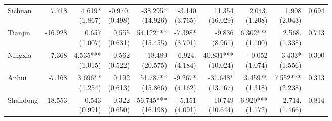\documentclass[12pt]{article}
\begin{document}
\begin{landscape}
\begin{small}
\begin{longtable}{lrrrrrrrrr}
    Sichuan & 7.718 & \makecell[r]{4.619*\\(1.867)} & \makecell[r]{-0.970.\\(0.498)} & \makecell[r]{-38.295*\\(14.926)} & \makecell[r]{-3.140\\(3.765)} & \makecell[r]{11.354\\(16.029)} & \makecell[r]{2.043.\\(1.208)} & \makecell[r]{1.908\\(2.043)} & 0.694 \\
    Tianjin & -16.928 & \makecell[r]{0.657\\(1.007)} & \makecell[r]{0.555\\(0.631)} & \makecell[r]{54.122***\\(15.455)} & \makecell[r]{-7.398*\\(3.701)} & \makecell[r]{-9.836\\(8.961)} & \makecell[r]{6.302***\\(1.100)} & \makecell[r]{2.568.\\(1.338)} & 0.713 \\
    Ningxia & -7.368 & \makecell[r]{4.535***\\(1.015)} & \makecell[r]{-0.562\\(0.522)} & \makecell[r]{-18.489\\(20.575)} & \makecell[r]{-6.924.\\(4.184)} & \makecell[r]{40.831***\\(10.024)} & \makecell[r]{-0.052\\(1.074)} & \makecell[r]{-3.433*\\(1.556)} & 0.300 \\
    Anhui & -7.168 & \makecell[r]{3.696**\\(1.254)} & \makecell[r]{0.192\\(0.613)} & \makecell[r]{51.787**\\(15.866)} & \makecell[r]{-9.267*\\(4.162)} & \makecell[r]{-31.648*\\(13.167)} & \makecell[r]{3.459**\\(1.318)} & \makecell[r]{7.552***\\(2.238)} & 0.313 \\
    Shandong & -18.553 & \makecell[r]{0.543\\(0.991)} & \makecell[r]{0.322\\(0.650)} & \makecell[r]{56.745***\\(16.198)} & \makecell[r]{-5.151\\(4.091)} & \makecell[r]{-10.749\\(10.644)} & \makecell[r]{6.920***\\(1.172)} & \makecell[r]{2.714.\\(1.466)} & 0.814 \\

\end{longtable}
\end{small}
\end{landscape}
\end{document}
